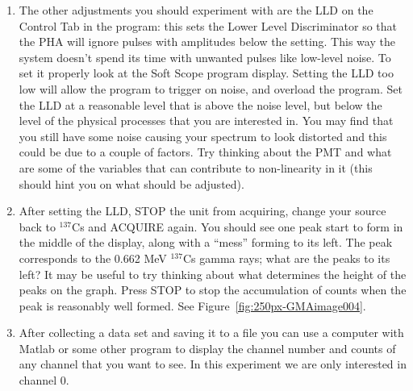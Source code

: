\documentclass{../lab}
\begin{document}
\begin{enumerate}
\begin{enumerate}
        \item The other adjustments you should experiment with are the LLD on the Control Tab in the program: this sets the Lower Level Discriminator so that the PHA will ignore pulses with amplitudes below the setting. This way the system doesn't spend its time with unwanted pulses like low-level noise. To set it properly look at the Soft Scope program display. Setting the LLD too low will allow the program to trigger on noise, and overload the program. Set the LLD at a reasonable level that is above the noise level, but below the level of the physical processes that you are interested in. You may find that you still have some noise causing your spectrum to look distorted and this could be due to a couple of factors. Try thinking about the PMT and what are some of the variables that can contribute to non-linearity in it (this should hint you on what should be adjusted).

        \item After setting the LLD, STOP the unit from acquiring, change your source back to $^{137}$Cs and ACQUIRE again. You should see one peak start to form in the middle of the display, along with a ``mess'' forming to its left. The peak corresponds to the 0.662 MeV $^{137}$Cs gamma rays; what are the peaks to its left? It may be useful to try thinking about what determines the height of the peaks on the graph. Press STOP to stop the accumulation of counts when the peak is reasonably well formed. See Figure~\ref{fig:250px-GMAimage004}.

        \item After collecting a data set and saving it to a file you can use a computer with Matlab or some other program to display the channel number and counts of any channel that you want to see. In this experiment we are only interested in channel 0.

    \end{enumerate}


\end{enumerate}
\end{document}
